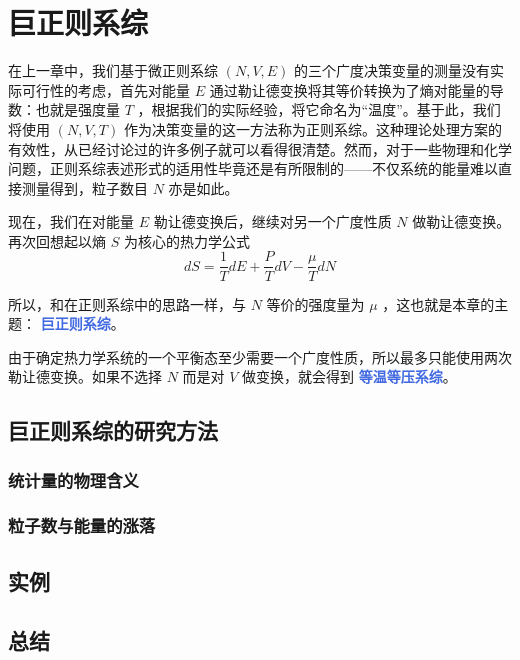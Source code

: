 
\chapter{巨正则系综}\label{cha:巨正则系综}

在上一章中，我们基于微正则系综 $(N,V,E)$ 的三个广度决策变量的测量没有实际可行性的考虑，首先对能量 $E$ 通过勒让德变换将其等价转换为了熵对能量的导数：也就是强度量 $T$ ，根据我们的实际经验，将它命名为“温度”。基于此，我们将使用 $(N,V,T)$ 作为决策变量的这一方法称为正则系综。这种理论处理方案的有效性，从已经讨论过的许多例子就可以看得很清楚。然而，对于一些物理和化学问题，正则系综表述形式的适用性毕竟还是有所限制的——不仅系统的能量难以直接测量得到，粒子数目 $N$ 亦是如此。

现在，我们在对能量 $E$ 勒让德变换后，继续对另一个广度性质 $N$ 做勒让德变换。再次回想起以熵 $S$ 为核心的热力学公式
\[
    dS = \frac{1}{T} dE + \frac{P}{T} dV - \frac{\mu}{T} dN
\]

所以，和在正则系综中的思路一样，与 $N$ 等价的强度量为 $\mu$ ，这也就是本章的主题： \textcolor{RoyalBlue}{\textbf{\kaishu 巨正则系综}}。

由于确定热力学系统的一个平衡态至少需要一个广度性质，所以最多只能使用两次勒让德变换。如果不选择 $N$ 而是对 $V$ 做变换，就会得到 \textcolor{RoyalBlue}{\textbf{\kaishu 等温等压系综}}。

\section{巨正则系综的研究方法}\label{sec:巨正则系综的研究方法}

\subsection{统计量的物理含义}\label{sec:统计量的物理含义}

\subsection{粒子数与能量的涨落}\label{sec:粒子数与能量的涨落}

\section{实例}\label{sec:巨正则实例}

\section{总结}\label{sec:巨正则总结}

